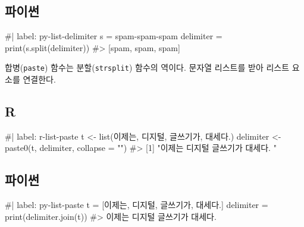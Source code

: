 \documentclass[
  letterpaper,
]{book}
\newenvironment{Shaded}{\begin{snugshade}}{\end{snugshade}}
\newcommand{\NormalTok}[1]{\textcolor[rgb]{0.00,0.23,0.31}{#1}}
\begin{document}
\subsection{파이썬}

\begin{Shaded}
\begin{Highlighting}[]
\NormalTok{\#| label: py{-}list{-}delimiter}
\NormalTok{s = \textquotesingle{}spam{-}spam{-}spam\textquotesingle{}}
\NormalTok{delimiter = \textquotesingle{}{-}\textquotesingle{}}
\NormalTok{print(s.split(delimiter))}
\NormalTok{\#\textgreater{} [\textquotesingle{}spam\textquotesingle{}, \textquotesingle{}spam\textquotesingle{}, \textquotesingle{}spam\textquotesingle{}]}
\end{Highlighting}
\end{Shaded}

합병(\texttt{paste}) 함수는 분할(\texttt{strsplit}) 함수의 역이다.
문자열 리스트를 받아 리스트 요소를 연결한다. 
 

\subsection{R}

\begin{Shaded}
\begin{Highlighting}[]
\NormalTok{\#| label: r{-}list{-}paste}
\NormalTok{t \textless{}{-} list(\textquotesingle{}이제는\textquotesingle{}, \textquotesingle{}디지털\textquotesingle{}, \textquotesingle{}글쓰기가\textquotesingle{}, \textquotesingle{}대세다.\textquotesingle{})}
\NormalTok{delimiter \textless{}{-} \textquotesingle{} \textquotesingle{}}
\NormalTok{paste0(t, delimiter, collapse = "")}
\NormalTok{\#\textgreater{} [1] "이제는 디지털 글쓰기가 대세다. "}
\end{Highlighting}
\end{Shaded}

\subsection{파이썬}

\begin{Shaded}
\begin{Highlighting}[]
\NormalTok{\#| label: py{-}list{-}paste}
\NormalTok{t = [\textquotesingle{}이제는\textquotesingle{}, \textquotesingle{}디지털\textquotesingle{}, \textquotesingle{}글쓰기가\textquotesingle{}, \textquotesingle{}대세다.\textquotesingle{}]}
\NormalTok{delimiter = \textquotesingle{} \textquotesingle{}}
\NormalTok{print(delimiter.join(t))}
\NormalTok{\#\textgreater{} 이제는 디지털 글쓰기가 대세다.}
\end{Highlighting}
\end{Shaded}
\end{document}
